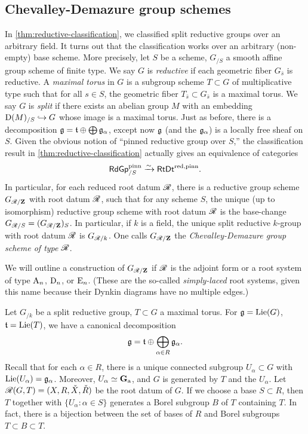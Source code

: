 \subsection{Chevalley-Demazure group schemes}

In \autoref{thm:reductive-classification}, we classified split reductive 
groups over an arbitrary field. It turns out that the classification works over 
an arbitrary (non-empty) base scheme. More precisely, let $S$ be a scheme, 
$G_{/S}$ a smooth affine group scheme of finite type. We say $G$ is 
\emph{reductive} if each geometric fiber $G_{\bar s}$ is reductive. A 
\emph{maximal torus} in $G$ is a subgroup scheme $T\subset G$ of multiplicative 
type such that for all $s\in S$, the geometric fiber 
$T_{\bar s}\subset G_{\bar s}$ is a maximal torus. We say $G$ is \emph{split} 
if there exists an abelian group $M$ with an embedding 
$\operatorname{D}(M)_{/S}\hookrightarrow G$ whose image is a maximal torus. Just as before, there 
is a decomposition $\mathfrak{g}=\mathfrak{t}\oplus \bigoplus \mathfrak{g}_\alpha$, except now $\mathfrak{g}$ (and 
the $\mathfrak{g}_\alpha$) is a locally free sheaf on $S$. Given the obvious notion of 
``pinned reductive group over $S$,'' the classification result in 
\autoref{thm:reductive-classification} actually gives an equivalence of 
categories 
\[
  \mathsf{RdGp}_{/S}^\mathrm{pinn} \xrightarrow\sim \mathsf{RtDt}^\mathrm{red,pinn} .
\]
In particular, for each reduced root datum $\mathscr{R}$, there is a reductive group 
scheme $G_{\mathscr{R}/\mathbf{Z}}$ with root datum $\mathscr{R}$, such that for any scheme $S$, the 
unique (up to isomorphism) reductive group scheme with root datum $\mathscr{R}$ is the 
base-change $G_{\mathscr{R}/S} = (G_{\mathscr{R}/\mathbf{Z}})_S$. In particular, if $k$ is a field, 
the unique split reductive $k$-group with root datum $\mathscr{R}$ is 
$G_{\mathscr{R}/k}$. One calls $G_{\mathscr{R}/\mathbf{Z}}$ the \emph{Chevalley-Demazure group scheme 
of type $\mathscr{R}$}. 

We will outline a construction of $G_{\mathscr{R}/\mathbf{Z}}$ if $\mathscr{R}$ is the adjoint 
form or a root system of type $\mathrm{A}_n$, $\mathrm{D}_n$, or $\mathrm{E}_n$. (These 
are the so-called \emph{simply-laced} root systems, given this name because 
their Dynkin diagrams have no multiple edges.)

Let $G_{/k}$ be a split reductive group, $T\subset G$ a maximal torus. For 
$\mathfrak{g}=\operatorname{Lie}(G)$, $\mathfrak{t}=\operatorname{Lie}(T)$, we have a canonical decomposition 
\[
  \mathfrak{g} = \mathfrak{t}\oplus \bigoplus_{\alpha\in R} \mathfrak{g}_\alpha .
\]
Recall that for each $\alpha\in R$, there is a unique connected subgroup 
$U_\alpha\subset G$ with $\operatorname{Lie}(U_\alpha)=\mathfrak{g}_\alpha$. Moreover, 
$U_\alpha\simeq \mathbf{G}_\mathrm{a}$, and $G$ is generated by $T$ and the $U_\alpha$. 
Let $\mathscr{R}(G,T)=(X,R,\check X,\check R)$ be the root datum of $G$. If we choose 
a base $S\subset R$, then $T$ together with $\{U_\alpha:\alpha\in S\}$ 
generates a Borel subgroup $B$ of $T$ containing $T$. In fact, there is a 
bijection between the set of bases of $R$ and Borel subgroups 
$T\subset B\subset T$. 

